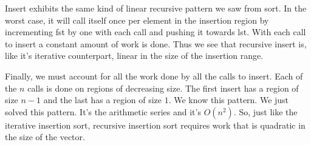 \documentclass[]{tufte-handout}
\begin{document}
Insert exhibits the same kind of linear recursive pattern we saw from sort. In the worst case, it will call itself once per element in the insertion region by incrementing fst by one with each call and pushing it towards lst. With each call to insert a constant amount of work is done. Thus we see that recursive insert is, like it's iterative counterpart, linear in the size of the insertion range. 

Finally, we must account for all the work done by all the calls to insert. Each of the $n$ calls is done on regions of decreasing size. The first insert has a region of size $n-1$ and the last has a region of size $1$. We know this pattern. We just solved this pattern. It's the arithmetic series and it's $O(n^2)$. So, just like the iterative insertion sort, recursive insertion sort requires work that is quadratic in the size of the vector. 
\end{document}
